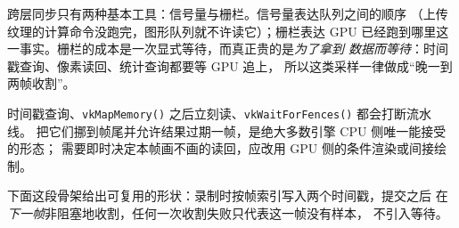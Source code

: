 \documentclass[12pt,a4paper,fontset=fandol]{ctexbook}
\newcommand{\Fn}[1]{\texttt{#1()}}
\newcommand{\Lang}[1]{\textsf{#1}}
\newcommand{\DomCPU}{\Lang{CPU}}
\newcommand{\DomGPU}{\Lang{GPU}}
\begin{document}
跨层同步只有两种基本工具：信号量与栅栏。信号量表达队列之间的顺序
（上传纹理的计算命令没跑完，图形队列就不许读它）；栅栏表达 \DomGPU{}
已经跑到哪里这一事实。栅栏的成本是一次显式等待，而真正贵的是\emph{为了拿到
数据而等待}：时间戳查询、像素读回、统计查询都要等 \DomGPU{} 追上，
所以这类采样一律做成``晚一到两帧收割''。

\begin{note}[title={帧内不许阻塞的读回三件套}]
时间戳查询、\Fn{vkMapMemory} 之后立刻读、\Fn{vkWaitForFences} 都会打断流水线。
把它们挪到帧尾并允许结果过期一帧，是绝大多数引擎 \DomCPU{} 侧唯一能接受的形态；
需要即时决定本帧画不画的读回，应改用 \DomGPU{} 侧的条件渲染或间接绘制。
\end{note}

下面这段骨架给出可复用的形状：录制时按帧索引写入两个时间戳，提交之后
在\emph{下一帧}非阻塞地收割，任何一次收割失败只代表这一帧没有样本，
不引入等待。
\end{document}
